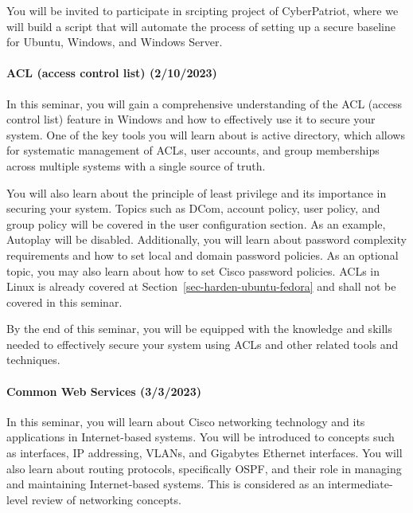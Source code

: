 \documentclass[
  letterpaper,
  DIV=11,
  numbers=noendperiod]{scrartcl}
\let\oldparagraph\paragraph
\renewcommand{\paragraph}[1]{\oldparagraph{#1}\mbox{}}
\begin{document}
You will be invited to participate in srcipting project of CyberPatriot,
where we will build a script that will automate the process of setting
up a secure baseline for Ubuntu, Windows, and Windows Server.

\hypertarget{acl-access-control-list-2102023}{%
\paragraph{ACL (access control list)
(2/10/2023)}\label{acl-access-control-list-2102023}}

In this seminar, you will gain a comprehensive understanding of the ACL
(access control list) feature in Windows and how to effectively use it
to secure your system. One of the key tools you will learn about is
active directory, which allows for systematic management of ACLs, user
accounts, and group memberships across multiple systems with a single
source of truth.

You will also learn about the principle of least privilege and its
importance in securing your system. Topics such as DCom, account policy,
user policy, and group policy will be covered in the user configuration
section. As an example, Autoplay will be disabled. Additionally, you
will learn about password complexity requirements and how to set local
and domain password policies. As an optional topic, you may also learn
about how to set Cisco password policies. ACLs in Linux is already
covered at Section~\ref{sec-harden-ubuntu-fedora} and shall not be
covered in this seminar.

By the end of this seminar, you will be equipped with the knowledge and
skills needed to effectively secure your system using ACLs and other
related tools and techniques.

\hypertarget{common-web-services-332023}{%
\paragraph{Common Web Services
(3/3/2023)}\label{common-web-services-332023}}

In this seminar, you will learn about Cisco networking technology and
its applications in Internet-based systems. You will be introduced to
concepts such as interfaces, IP addressing, VLANs, and Gigabytes
Ethernet interfaces. You will also learn about routing protocols,
specifically OSPF, and their role in managing and maintaining
Internet-based systems. This is considered as an intermediate-level
review of networking concepts.
\end{document}
